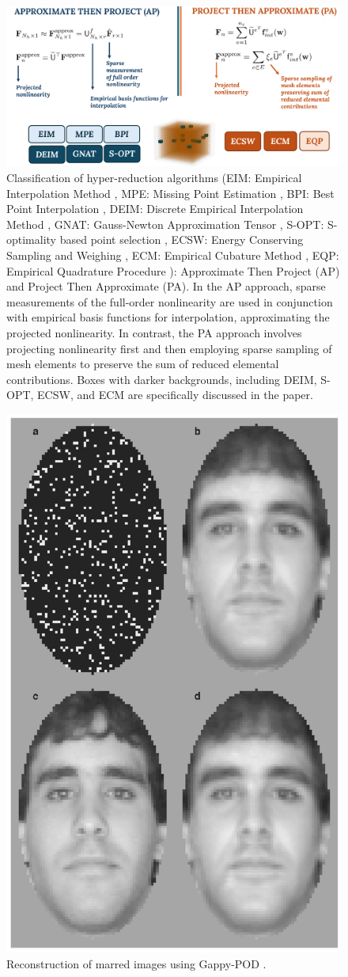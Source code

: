 \documentclass[11pt]{article}
\begin{document}
\begin{figure}[t]
    \centering
    \includegraphics[width=\linewidth]{ATP_PTA2.pdf}
    \caption{Classification of hyper-reduction algorithms \protect\footnotemark(EIM: Empirical Interpolation Method \cite{barrault2004empirical}, MPE: Missing Point Estimation \cite{astrid2008missing}, BPI: Best Point Interpolation \cite{nguyen2007best}, DEIM: Discrete Empirical Interpolation Method \cite{chaturantabut2010nonlinear}, GNAT: Gauss-Newton Approximation Tensor \cite{carlberg2011efficient}, S-OPT: S-optimality based point selection \cite{lauzon2024s-opt}, ECSW: Energy Conserving Sampling and Weighing \cite{farhat2014dimensional}, ECM: Empirical Cubature Method \cite{hernandez2017dimensional}, EQP: Empirical Quadrature Procedure \cite{Patera_2017_EQP}): Approximate Then Project (AP) and Project Then Approximate (PA). In the AP approach, sparse measurements of the full-order nonlinearity are used in conjunction with empirical basis functions for interpolation, approximating the projected nonlinearity. In contrast, the PA approach involves projecting nonlinearity first and then employing sparse sampling of mesh elements to preserve the sum of reduced elemental contributions. Boxes with darker backgrounds, including DEIM, S-OPT, ECSW, and ECM are specifically discussed in the paper.}
    \label{fig:hyp_algo}
\end{figure}

\begin{figure}[t!]
    \centering
    \includegraphics[width=0.25\linewidth]{gappy_pod2.jpg}
    \caption{Reconstruction of marred images using Gappy-POD \cite{sirovich1987low-dimensional}.}
\label{fig:pic_db}
\end{figure}
\end{document}
